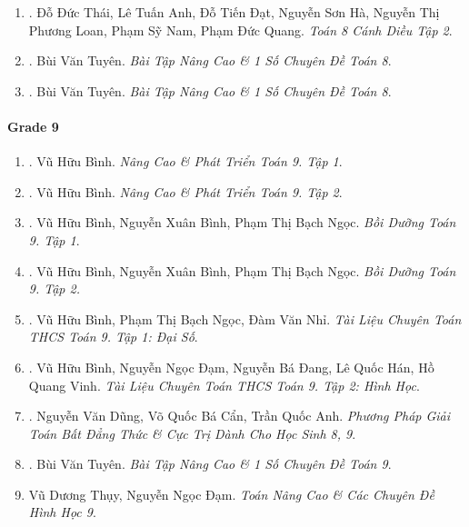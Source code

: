 \documentclass{article}
\begin{document}
\begin{enumerate}
	\item \cite{SGK_Toan_8_Canh_Dieu_tap_2}. Đỗ Đức Thái, Lê Tuấn Anh, Đỗ Tiến Đạt, Nguyễn Sơn Hà, Nguyễn Thị Phương Loan, Phạm Sỹ Nam, Phạm Đức Quang. {\it Toán 8 Cánh Diều Tập 2}.\hfill{\sf[reading]}
	
	\item \cite{Tuyen_Toan_8}. Bùi Văn Tuyên. {\it Bài Tập Nâng Cao \& 1 Số Chuyên Đề Toán 8}.\hfill{\sf[reading]}
	
	\item \cite{Tuyen_Toan_8_old}. Bùi Văn Tuyên. {\it Bài Tập Nâng Cao \& 1 Số Chuyên Đề Toán 8}.\hfill{\sf[done]}
\end{enumerate}

\paragraph{Grade 9}

\begin{enumerate}
	\item \cite{Binh_Toan_9_tap_1}. Vũ Hữu Bình. {\it Nâng Cao \& Phát Triển Toán 9. Tập 1}.\hfill{\sf[done]}
	
	\item \cite{Binh_Toan_9_tap_2}. Vũ Hữu Bình. {\it Nâng Cao \& Phát Triển Toán 9. Tập 2}.\hfill{\sf[done]}
	
	\item \cite{Binh_boi_duong_Toan_9_tap_1}. Vũ Hữu Bình, Nguyễn Xuân Bình, Phạm Thị Bạch Ngọc. {\it Bồi Dưỡng Toán 9. Tập 1}.\hfill{\sf[done]}
	
	\item \cite{Binh_boi_duong_Toan_9_tap_2}. Vũ Hữu Bình, Nguyễn Xuân Bình, Phạm Thị Bạch Ngọc. {\it Bồi Dưỡng Toán 9. Tập 2.}\hfill{\sf[done]}
	
	\item \cite{TLCT_THCS_Toan_9_dai_so}. Vũ Hữu Bình, Phạm Thị Bạch Ngọc, Đàm Văn Nhỉ. {\it Tài Liệu Chuyên Toán THCS Toán 9. Tập 1: Đại Số}.\hfill{\sf[done]}
	
	\item \cite{TLCT_THCS_Toan_9_hinh_hoc}. Vũ Hữu Bình, Nguyễn Ngọc Đạm, Nguyễn Bá Đang, Lê Quốc Hán, Hồ Quang Vinh. {\it Tài Liệu Chuyên Toán THCS Toán 9. Tập 2: Hình Học}.\hfill{\sf[done]}
	
	\item \cite{Dung_Can_Anh_bdt_8_9}. Nguyễn Văn Dũng, Võ Quốc Bá Cẩn, Trần Quốc Anh. {\it Phương Pháp Giải Toán Bất Đẳng Thức \& Cực Trị Dành Cho Học Sinh 8, 9}.\hfill{\sf[reading]}
	
	\item \cite{Tuyen_Toan_9_old}. Bùi Văn Tuyên. {\it Bài Tập Nâng Cao \& 1 Số Chuyên Đề Toán 9}.\hfill{\sf[done]}
	
	\item Vũ Dương Thụy, Nguyễn Ngọc Đạm. {\it Toán Nâng Cao \& Các Chuyên Đề Hình Học 9}.
\end{enumerate}
\end{document}
